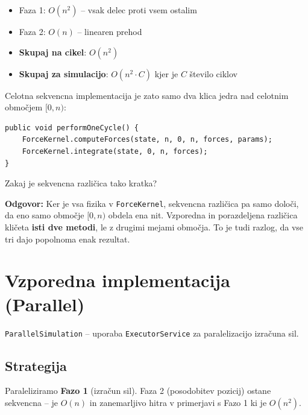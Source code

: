 \documentclass[12pt,a4paper]{article}
\begin{document}
\begin{itemize}
    \item Faza 1: $O(n^2)$ -- vsak delec proti vsem ostalim
    \item Faza 2: $O(n)$ -- linearen prehod
    \item \textbf{Skupaj na cikel}: $O(n^2)$
    \item \textbf{Skupaj za simulacijo}: $O(n^2 \cdot C)$ kjer je $C$ \v{s}tevilo ciklov
\end{itemize}

Celotna sekvencna implementacija je zato samo dva klica jedra nad celotnim obmo\v{c}jem $[0, n)$:

\begin{lstlisting}
public void performOneCycle() {
    ForceKernel.computeForces(state, n, 0, n, forces, params);
    ForceKernel.integrate(state, 0, n, forces);
}
\end{lstlisting}

\begin{vprasanje}
Zakaj je sekvencna razli\v{c}ica tako kratka?

\textbf{Odgovor:} Ker je vsa fizika v \texttt{ForceKernel}, sekvencna razli\v{c}ica pa samo dolo\v{c}i, da eno samo obmo\v{c}je $[0, n)$ obdela ena nit. Vzporedna in porazdeljena razli\v{c}ica kli\v{c}eta \textbf{isti dve metodi}, le z drugimi mejami obmo\v{c}ja. To je tudi razlog, da vse tri dajo popolnoma enak rezultat.
\end{vprasanje}

\section{Vzporedna implementacija (Parallel)}

\texttt{ParallelSimulation} -- uporaba \texttt{ExecutorService} za paralelizacijo izra\v{c}una sil.

\subsection{Strategija}

\begin{kljucno}
Paraleliziramo \textbf{Fazo 1} (izra\v{c}un sil). Faza 2 (posodobitev pozicij) ostane sekvencna -- je $O(n)$ in zanemarljivo hitra v primerjavi s Fazo 1 ki je $O(n^2)$.
\end{kljucno}
\end{document}
